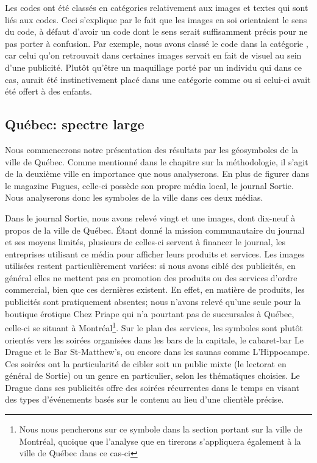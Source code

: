 Les codes ont été classés en catégories relativement aux images et textes qui sont liés aux codes.
Ceci s'explique par le fait que les images en soi orientaient le sens du code, à défaut d'avoir un code dont le sens serait suffisamment précis pour ne pas porter à confusion.
Par exemple, nous avons classé le code  dans la catégorie , car celui qu'on retrouvait dans certaines images servait en fait de visuel au sein d'une publicité.
Plutôt qu'être un maquillage porté par un individu qui dans ce cas, aurait été instinctivement placé dans une catégorie comme  ou  si celui-ci avait été offert à des enfants.

\subsection{Québec: spectre large}
\label{sec:qu_bec_spectre_large}
Nous commencerons notre présentation des résultats par les géosymboles de la ville de Québec.
Comme mentionné dans le chapitre sur la méthodologie, il s'agit de la deuxième ville en importance que nous analyserons.
En plus de figurer dans le magazine Fugues, celle-ci possède son propre média local, le journal Sortie.
Nous analyserons donc les symboles de la ville dans ces deux médias.

Dans le journal Sortie, nous avons relevé vingt et une images, dont dix-neuf à propos de la ville de Québec.
Étant donné la mission communautaire du journal et ses moyens limités, plusieurs de celles-ci servent à financer le journal, les entreprises utilisant ce média pour afficher leurs produits et services.
Les images utilisées restent particulièrement variées: si nous avons ciblé des publicités, en général elles ne mettent pas en promotion des produits ou des services d'ordre commercial, bien que ces dernières existent.
En effet, en matière de produits, les publicités sont pratiquement absentes; nous n'avons relevé qu'une seule pour la boutique érotique Chez Priape qui n'a pourtant pas de succursales à Québec, celle-ci se situant à Montréal\footnote{Nous nous pencherons sur ce symbole dans la section portant sur la ville de Montréal, quoique que l'analyse que en tirerons s'appliquera également à la ville de Québec dans ce cas-ci}.
Sur le plan des services, les symboles sont plutôt orientés vers les soirées organisées dans les bars de la capitale, le cabaret-bar Le Drague et le Bar St-Matthew’s, ou encore dans les saunas comme L'Hippocampe.
Ces soirées ont la particularité de cibler soit un public mixte (le lectorat en général de Sortie) ou un genre en particulier, selon les thématiques choisies.
Le Drague dans ses publicités offre des soirées récurrentes dans le temps en visant des types d'événements basés sur le contenu au lieu d'une clientèle précise.

